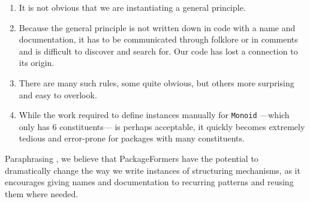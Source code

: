 \documentclass[sigplan,screen]{acmart}
\begin{document}
\newpage
\noindent
\begin{quoting}
\begin{enumerate}
\item It is not obvious that we are instantiating a general principle.

\item Because the general principle is not written down in
code with a name and documentation, it has to be communicated
through folklore or in comments and is difficult to discover
and search for. Our code has lost a connection to its origin.

\item There are many such rules, some quite obvious, but
others more surprising and easy to overlook.

\item While the work required to define instances manually for \texttt{Monoid}
---which only has 6 constituents--- is perhaps acceptable,
it quickly becomes extremely tedious and error-prone for packages
with many constituents.
\end{enumerate}
\end{quoting}

Paraphrasing \cite{deriving_via},
we believe that \textsf{PackageFormer}s have the potential to dramatically change the way we write instances
of structuring mechanisms, as it encourages giving names and documentation to recurring patterns
and reusing them where needed.



\end{document}
